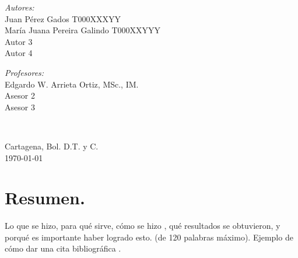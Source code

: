 \documentclass[10pt]{article}
\begin{document}
\begin{center}
\begin{minipage}{0.46\textwidth}
\begin{flushleft}
\emph{Autores:}\\	
Juan Pérez Gados T000XXXYY\\
María Juana Pereira Galindo T000XXYYY\\
Autor 3\\ 
Autor 4
\end{flushleft}																		%
\end{minipage}		
\begin{minipage}{0.52\textwidth}		
\vspace{-0.6cm}											%
\begin{flushright} \large															%
\emph{Profesores:} \\																	%
Edgardo W. Arrieta Ortiz, MSc., IM.\\
Asesor 2	\\
Asesor 3														%
\end{flushright}																	%
\end{minipage}	
\vspace*{1cm}
 	
 		\\																		%
\vspace{2cm} 																				
\begin{center}	
Cartagena, Bol. D.T. y C. \\
{\large \today}																	%
 			\end{center}												  						
\end{center}							 											
																					
\newpage																		

\tableofcontents 

\newpage

\section{Resumen.}



 Lo que se hizo, para qué sirve, cómo se hizo , qué resultados se obtuvieron, y porqué es importante haber logrado esto.  (de 120 palabras máximo).
 Ejemplo de cómo dar una cita bibliográfica \cite{IEEEreferencias:Ref1}.
\end{document}

